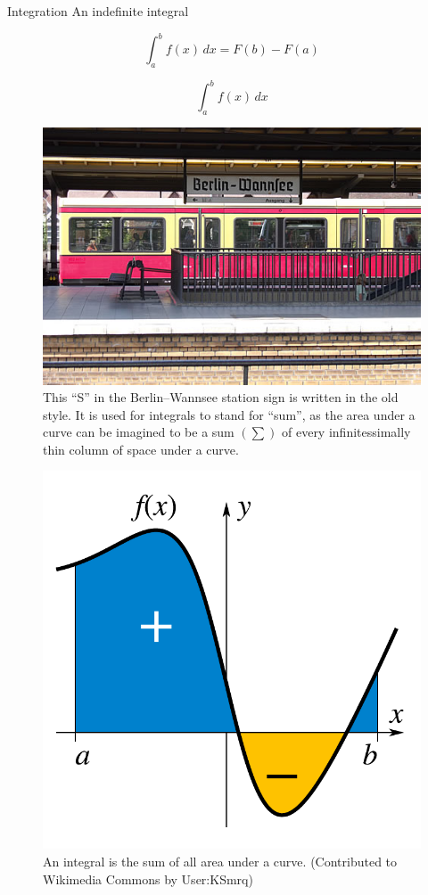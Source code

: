 \documentclass[a4paper,10pt]{scrartcl}
\begin{document}
Integration 
An indefinite integral 



\begin{equation}
\int_a^b \! f(x)\,dx = F(b) - F(a)
\end{equation}

\begin{equation}
\int_a^b \! f(x)\,dx
\end{equation}

\begin{figure}[!ht]
\begin{center}
\includegraphics[width=.5\linewidth]{figures/NumericalAndMath/BerlinWannsee.jpg}
\end{center}
\caption{This ``S'' in the Berlin--Wannsee station sign is written in the old style. It is used for integrals to stand for ``sum'', as the area under a curve can be imagined to be a sum $\left( \sum \right)$ of every infinitessimally thin column of space under a curve.}
\end{figure}

\begin{figure}[!ht]
\begin{center}
\includegraphics[width=.5\linewidth]{figures/NumericalAndMath/IntegralExample.pdf}
\end{center}
\caption{An integral is the sum of all area under a curve. (Contributed to Wikimedia Commons by User:KSmrq)}
\end{figure}
\end{document}
